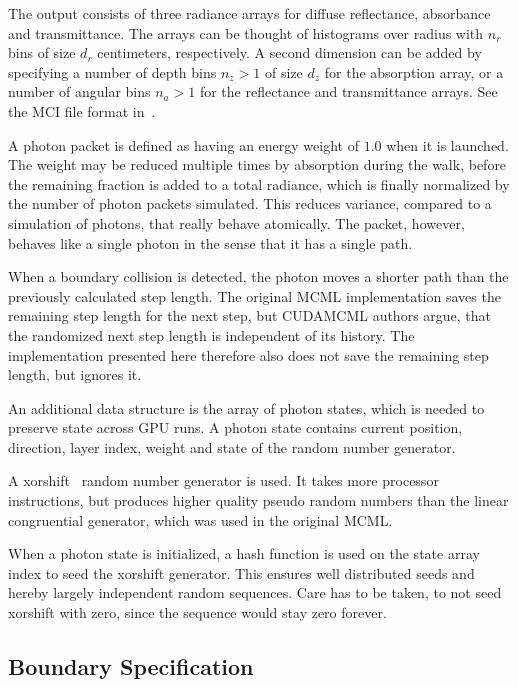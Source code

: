 \documentclass[]{article}
\begin{document}
The output consists of three radiance arrays for diffuse reflectance, absorbance and transmittance. The arrays can be thought of histograms over radius with $n_r$ bins of size $d_r$ centimeters, respectively. A second dimension can be added by specifying a number of depth bins $n_z > 1$ of size $d_z$ for the absorption array, or a number of angular bins $n_a > 1$ for the reflectance and transmittance arrays. See the MCI file format in~\cite{wang1992monte}.

A photon packet is defined as having an energy weight of $1.0$ when it is launched. The weight may be reduced multiple times by absorption during the walk, before the remaining fraction is added to a total radiance, which is finally normalized by the number of photon packets simulated. This reduces variance, compared to a simulation of photons, that really behave atomically. The packet, however, behaves like a single photon in the sense that it has a single path.

When a boundary collision is detected, the photon moves a shorter path than the previously calculated step length. The original MCML implementation saves the remaining step length for the next step, but CUDAMCML authors argue, that the randomized next step length is independent of its history. The implementation presented here therefore also does not save the remaining step length, but ignores it.

An additional data structure is the array of photon states, which is needed to preserve state across GPU runs. A photon state contains current position, direction, layer index, weight and state of the random number generator.

A xorshift~\cite{marsaglia2003xorshift} random number generator is used. It takes more processor instructions, but produces higher quality pseudo random numbers than the linear congruential generator, which was used in the original MCML.

When a photon state is initialized, a hash function is used on the state array index to seed the xorshift generator. This ensures well distributed seeds and hereby largely independent random sequences. Care has to be taken, to not seed xorshift with zero, since the sequence would stay zero forever.

\subsection{Boundary Specification}
\label{impl:boundary_specification}
\end{document}
